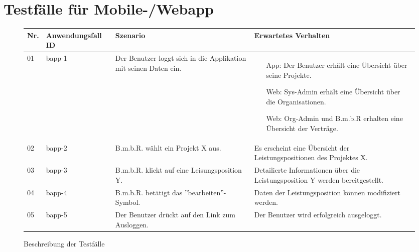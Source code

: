 
\section{Testfälle für Mobile-/Webapp}
\begin{figure}[!h]
	\begin{center}
		\begin{tabularx}{\textwidth}{ p{} | p{} | p{} | X }
			\textbf{Nr.} & \textbf{Anwendungsfall ID} & \textbf{Szenario} & \textbf{Erwartetes Verhalten} \\ \hline
			01 & bapp-1 & Der Benutzer loggt sich in die Applikation mit seinen Daten ein. & 
			\begin{itemize}
				\item[App:] Der Benutzer erhält eine Übersicht über seine Projekte.
				\item[Web:] Sys-Admin erhält eine Übersicht über die Organisationen.
				\item[Web:] Org-Admin und B.m.b.R erhalten eine Übersicht der Verträge.
			\end{itemize} \\ \hline
			02 & bapp-2 & B.m.b.R. wählt ein Projekt X aus. & Es erscheint eine Übersicht der Leistungspositionen des Projektes X. \\ \hline
			03 & bapp-3 & B.m.b.R. klickt auf eine Leisungsposition Y. & Detailierte Informationen über die Leistungsposition Y werden bereitgestellt. \\ \hline
			04 & bapp-4 & B.m.b.R. betätigt das ''bearbeiten''-Symbol. & Daten der Leistungsposition können modifiziert werden. \\ \hline
			05 & bapp-5 & Der Benutzer drückt auf den Link zum Ausloggen. & Der Benutzer wird erfolgreich ausgeloggt. \\ \hline
		\end{tabularx}	
	\end{center}
	\caption{Beschreibung der Testfälle}
	\label{fig:testfaelle-beide-anwendungen-tabelle}
\end{figure}

\newpage
